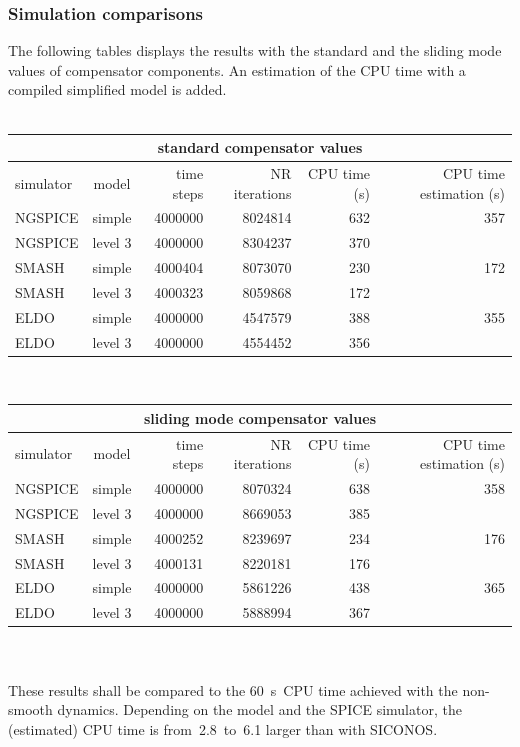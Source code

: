 \documentclass{article}
\begin{document}
\subsubsection{Simulation comparisons}
The following tables displays the results with the standard and the sliding mode values of compensator components. An estimation of the CPU time with a compiled simplified model is added.
\\
\\
\begin{tabular}{|l|c|r|r|r|r|}
\hline
\multicolumn{6}{|c|}{\textbf{standard compensator values}}\\
\hline
simulator & model & time steps & NR iterations & CPU time (s) & CPU time estimation (s)\\
\hline
NGSPICE & simple  & 4000000 & 8024814 & 632 & 357\\
NGSPICE & level 3 & 4000000 & 8304237 & 370 & \\
\hline
SMASH   & simple  & 4000404 & 8073070 & 230 & 172\\
SMASH   & level 3 & 4000323 & 8059868 & 172 & \\
\hline
ELDO    & simple  & 4000000 & 4547579 & 388 & 355\\
ELDO    & level 3 & 4000000 & 4554452 & 356 & \\
\hline
\end{tabular}\\
\begin{tabular}{|l|c|r|r|r|r|}
\hline
\multicolumn{6}{|c|}{\textbf{sliding mode compensator values}}\\
\hline
simulator & model & time steps & NR iterations & CPU time (s) & CPU time estimation (s)\\
\hline
NGSPICE & simple  & 4000000 & 8070324 & 638 & 358\\
NGSPICE & level 3 & 4000000 & 8669053 & 385 & \\
\hline
SMASH   & simple  & 4000252 & 8239697 & 234 & 176\\
SMASH   & level 3 & 4000131 & 8220181 & 176 & \\
\hline
ELDO    & simple  & 4000000 & 5861226 & 438 & 365\\
ELDO    & level 3 & 4000000 & 5888994 & 367 & \\
\hline
\end{tabular}
\\
\\
These results shall be compared to the 60~s~CPU time achieved with the non-smooth dynamics.
Depending on the model and the SPICE simulator, the (estimated) CPU time is from~2.8~to~6.1
larger than with SICONOS.\\
\end{document}
